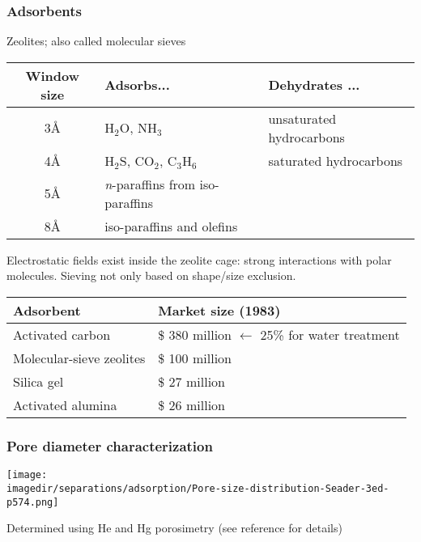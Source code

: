 \begin{frame}\frametitle{Adsorbents}
	Zeolites; also called {\color{purple}molecular sieves}

	\begin{tabular}{cll}\\
		{\small \textbf{Window size}}	&	{\small \textbf{Adsorbs}...}	&	{\small \textbf{Dehydrates} ...}\vspace{6pt}\\ \hline
		3\AA			&	$\text{H}_2\text{O}$, $\text{NH}_3$		& 	unsaturated hydrocarbons\\
		4\AA			&  	$\text{H}_2\text{S}$, $\text{CO}_2$, $\text{C}_3\text{H}_6$		& 	saturated hydrocarbons\\
		5\AA			&	\emph{n}-paraffins from iso-paraffins   & \\
		8\AA			& 	iso-paraffins and olefins				&	\\
	\end{tabular}
	\vspace{5pt}

	{\small Electrostatic fields exist inside the zeolite cage: strong interactions with polar molecules. Sieving not only based on shape/size exclusion.}

	\vspace{3pt}

	\vspace{-5pt}
	\begin{tabular}{ll}\\
		\textbf{Adsorbent}				&	\textbf{Market size (1983)} \vspace{6pt}\\ \hline
			Activated carbon 			&	\$ 380 million $\longleftarrow$ 25\% for water treatment \\
			Molecular-sieve zeolites 	&	\$ 100 million  \\
			Silica gel					&	\$ 27 million  \\
			Activated alumina			&	\$ 26 million \\\hline
	\end{tabular}
\end{frame}

\begin{frame}\frametitle{Pore diameter characterization}
	\begin{center}
		\texttt{[image: \\imagedir/separations/adsorption/Pore-size-distribution-Seader-3ed-p574.png]}
	\end{center}
	{\scriptsize Determined using He and Hg porosimetry (see reference for details)}
\end{frame}

